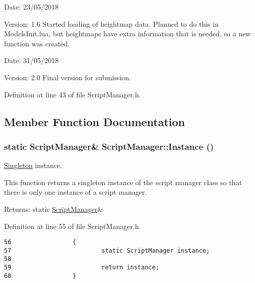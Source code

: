 \begin{Desc}
\item[Date:]23/05/2018 \end{Desc}
\begin{Desc}
\item[Version:]1.6 Started loading of heightmap data. Planned to do this in ModelsInit.lua, but heightmaps have extra information that is needed, so a new function was created.\end{Desc}
\begin{Desc}
\item[Date:]31/05/2018 \end{Desc}
\begin{Desc}
\item[Version:]2.0 Final version for submission. \end{Desc}


Definition at line 43 of file ScriptManager.h.

\subsection{Member Function Documentation}
\hypertarget{class_script_manager_2d9fe01b9c07cdc83d2da4168f4f6cc5}{
\subsubsection[Instance]{\setlength{\rightskip}{0pt plus 5cm}static {\bf ScriptManager}\& ScriptManager::Instance ()}}
\label{class_script_manager_2d9fe01b9c07cdc83d2da4168f4f6cc5}


\hyperlink{class_singleton}{Singleton} instance. 

This function returns a singleton instance of the script manager class so that there is only one instance of a script manager.

\begin{Desc}
\item[Returns:]static \hyperlink{class_script_manager}{ScriptManager}\& \end{Desc}


Definition at line 55 of file ScriptManager.h.

\begin{Code}\begin{verbatim}56                 {
57                         static ScriptManager instance;
58 
59                         return instance;
60                 }
\end{verbatim}
\end{Code}


